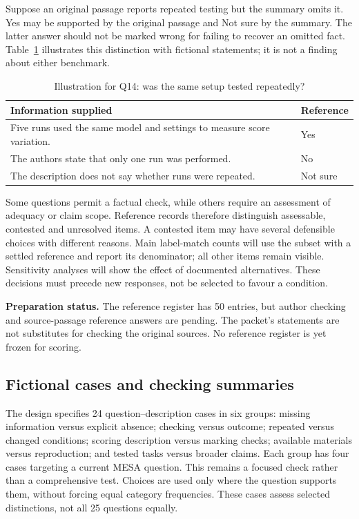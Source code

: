 \documentclass[10pt,conference]{IEEEtran}
\begin{document}
Suppose an original passage reports repeated testing but the summary omits it. Yes may be supported by the original passage and Not sure by the summary. The latter answer should not be marked wrong for failing to recover an omitted fact. Table~\ref{tab:example} illustrates this distinction with fictional statements; it is not a finding about either benchmark.

\begin{table}[t]
\caption{Illustration for Q14: was the same setup tested repeatedly?}
\label{tab:example}
\small
\begin{tabularx}{\columnwidth}{@{}Xp{}@{}}
\toprule
Information supplied & Reference \\
\midrule
Five runs used the same model and settings to measure score variation. & Yes \\
The authors state that only one run was performed. & No \\
The description does not say whether runs were repeated. & Not sure \\
\bottomrule
\end{tabularx}
\end{table}

Some questions permit a factual check, while others require an assessment of adequacy or claim scope. Reference records therefore distinguish assessable, contested and unresolved items. A contested item may have several defensible choices with different reasons. Main label-match counts will use the subset with a settled reference and report its denominator; all other items remain visible. Sensitivity analyses will show the effect of documented alternatives. These decisions must precede new responses, not be selected to favour a condition.

\textbf{Preparation status.} The reference register has 50 entries, but author checking and source-passage reference answers are pending. The packet's statements are not substitutes for checking the original sources. No reference register is yet frozen for scoring.

\subsection{Fictional cases and checking summaries}
The design specifies 24 question--description cases in six groups: missing information versus explicit absence; checking versus outcome; repeated versus changed conditions; scoring description versus marking checks; available materials versus reproduction; and tested tasks versus broader claims. Each group has four cases targeting a current MESA question. This remains a focused check rather than a comprehensive test. Choices are used only where the question supports them, without forcing equal category frequencies. These cases assess selected distinctions, not all 25 questions equally.
\end{document}
